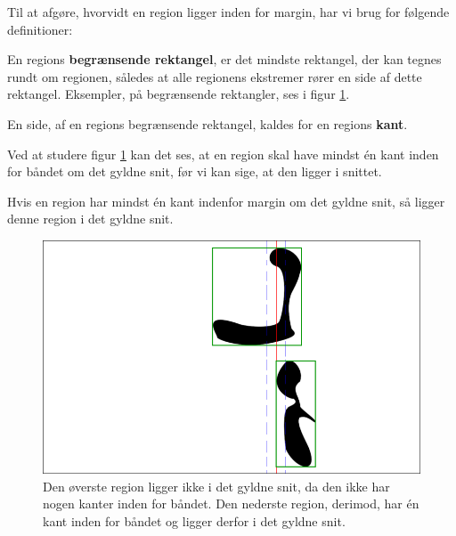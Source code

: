 {Til at afgøre, hvorvidt en region ligger inden for margin, har vi brug
for følgende definitioner:
\begin{definition}
    En regions \textbf{begrænsende rektangel}, er det mindste rektangel,
    der kan tegnes rundt om regionen, således at alle regionens
    ekstremer rører en side af dette rektangel. Eksempler, på
    begrænsende rektangler, ses i figur \ref{bbox_section}.
    \label{def_begraensende}
\end{definition}
\begin{definition}
    En side, af en regions begrænsende rektangel, kaldes for en regions
    \textbf{kant}.
    \label{def_region_kant}
\end{definition}
Ved at studere figur \ref{bbox_section} kan det ses, at en region skal
have mindst én kant inden for båndet om det gyldne snit, før vi kan
sige, at den ligger i snittet.
\begin{definition}
    Hvis en region har mindst én kant indenfor margin om det gyldne
    snit, så ligger denne region i det gyldne snit.
    \label{def_naiv}
\end{definition}

\begin{figure}[p]
    \begin{center}
        \includegraphics[scale=\imgscale,angle=0]{afsnit/vores_implementation/billeder/naiv_algoritme/bbox_section}
    \end{center}
    \caption[Begrænsende rektangler]{Den øverste region ligger ikke i
    det gyldne snit, da den ikke har nogen kanter inden for båndet. Den
    nederste region, derimod, har én kant inden for båndet og ligger
    derfor i det gyldne snit.} \label{bbox_section}
\end{figure}

}
